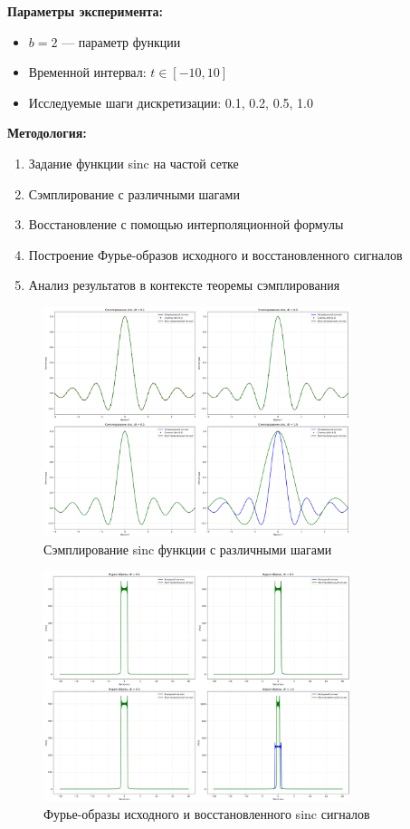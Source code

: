 \textbf{Параметры эксперимента:}
\begin{itemize}
    \item $b = 2$ — параметр функции
    \item Временной интервал: $t \in [-10, 10]$
    \item Исследуемые шаги дискретизации: 0.1, 0.2, 0.5, 1.0
\end{itemize}

\textbf{Методология:}
\begin{enumerate}
    \item Задание функции sinc на частой сетке
    \item Сэмплирование с различными шагами
    \item Восстановление с помощью интерполяционной формулы
    \item Построение Фурье-образов исходного и восстановленного сигналов
    \item Анализ результатов в контексте теоремы сэмплирования
\end{enumerate}

\begin{figure}[H]
    \centering
    \includegraphics[width=0.8\textwidth]{images/task2/sampling_sinc.png}
    \caption{Сэмплирование sinc функции с различными шагами}
    \label{fig:sampling_sinc}
\end{figure}

\begin{figure}[H]
    \centering
    \includegraphics[width=0.8\textwidth]{images/task2/sampling_sinc_fourier.png}
    \caption{Фурье-образы исходного и восстановленного sinc сигналов}
    \label{fig:sampling_sinc_fourier}
\end{figure}

